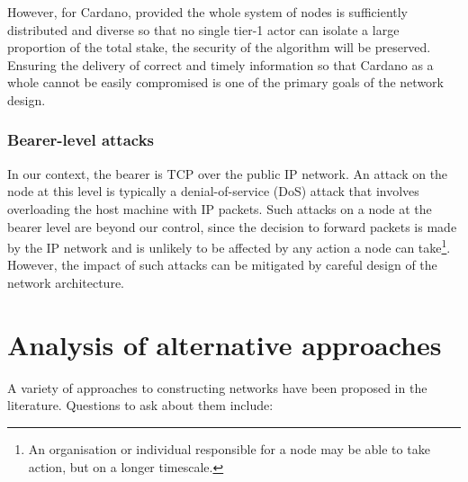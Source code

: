 \documentclass[11pt,a4paper]{article}
\begin{document}
However, for Cardano, provided the whole system of nodes is sufficiently
distributed and diverse so that no single tier-1 actor can isolate a
large proportion of the total stake, the security of the algorithm will
be preserved. Ensuring the delivery of correct and timely information so
that Cardano as a whole cannot be easily compromised is one of the
primary goals of the network design.

\subsubsection{Bearer-level attacks}
\label{bearer-level-attacks}

In our context, the bearer is TCP over the public IP network. An attack
on the node at this level is typically a denial-of-service (DoS) attack
that involves overloading the host machine with IP packets. Such attacks
on a node at the bearer level are beyond our control, since the decision
to forward packets is made by the IP network and is unlikely to be
affected by any action a node can take\footnote{An organisation or
  individual responsible for a node may be able to take action, but on a
  longer timescale.}. However, the impact of such attacks can be
mitigated by careful design of the network architecture.

\section{Analysis of alternative approaches}
\label{analysis-of-alternative-approaches}

A variety of approaches to constructing networks have been proposed in
the literature. Questions to ask about them include:
\end{document}
